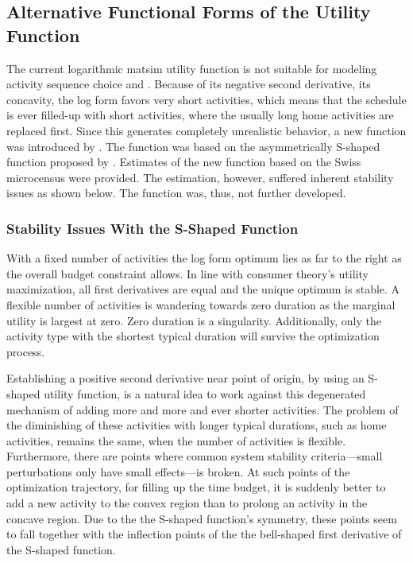 
\subsection{Alternative Functional Forms of the Utility Function}
\label{sec:alternative-functions}
The current logarithmic \gls{matsim} utility function is not suitable for modeling activity sequence choice \citet[][p.127f]{Feil_PhDThesis_2010} and \citet[][]{MATSim_Userguide_2015}. Because of its negative second derivative, \ie its concavity, the log form favors very short activities, which means that the schedule is ever filled-up with short activities, where the usually long home activities are replaced first. Since this generates completely unrealistic behavior, a new function was introduced by \citet[][p.129ff]{Feil_PhDThesis_2010}. The function was based on the asymmetrically S-shaped function proposed by \citet[][]{Joh_PhDThesis_2004}. Estimates of the new function based on the Swiss microcensus were provided. The estimation, however, suffered inherent stability issues as shown below. The function was, thus, not further developed.

\subsubsection{Stability Issues With the S-Shaped Function}
With a fixed number of activities the log form optimum lies as far to the right as the overall budget constraint allows. 
In line with consumer theory's utility maximization, all first derivatives are equal and the unique optimum is stable.
A flexible number of activities is wandering towards zero duration as the marginal utility is largest at zero. 
Zero duration is a singularity. 
Additionally, only the activity type with the shortest typical duration will survive the optimization process.

Establishing a positive second derivative near point of origin, by using an S-shaped utility function, is a natural idea to work against this degenerated mechanism of adding more and more and ever shorter activities.
The problem of the diminishing of these activities with longer typical durations, such as home activities, remains the same, when the number of activities is flexible.
Furthermore, there are points where common system stability criteria---small perturbations only have small effects---is broken.
At such points of the optimization trajectory, for filling up the time budget, it is suddenly better to add a new activity to the convex region than to prolong an activity in the concave region.
Due to the the S-shaped function's symmetry, these points seem to fall together with the inflection points of the the bell-shaped first derivative of the S-shaped function.

